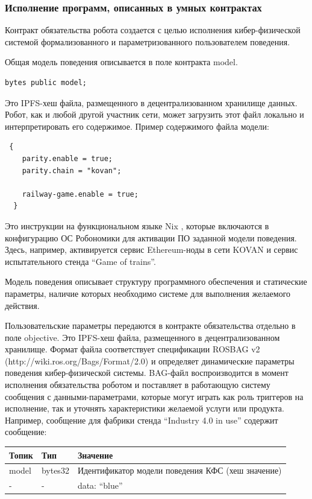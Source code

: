 \documentclass{article}
\begin{document}
\subsubsection{Исполнение программ, описанных в умных контрактах}

Контракт обязательства робота создается с целью исполнения кибер-физической системой формализованного и параметризованного пользователем поведения. 

Общая модель поведения описывается в поле контракта model.
\begin{lstlisting}
bytes public model;
\end{lstlisting}

Это IPFS-хеш файла, размещенного в децентрализованном хранилище данных. Робот, как и любой другой участник сети, может загрузить этот файл локально и интерпретировать его содержимое. Пример содержимого файла модели:

\begin{lstlisting}
 {
    parity.enable = true;
    parity.chain = "kovan";

    railway-game.enable = true;
  }
\end{lstlisting}

Это инструкции на функциональном языке Nix \cite{Dolstra2010NixOS:Distribution}, которые включаются в конфигурацию ОС Робономики для активации ПО заданной модели поведения. Здесь, например, активируется сервис Ethereum-ноды в сети KOVAN и сервис испытательного стенда “Game of trains”.

Модель поведения описывает структуру программного обеспечения и статические параметры, наличие которых необходимо системе для выполнения желаемого действия.

Пользовательские параметры передаются в контракте обязательства отдельно в поле objective. Это IPFS-хеш файла, размещенного в децентрализованном хранилище. Формат файла соответствует спецификации ROSBAG v2 (http://wiki.ros.org/Bags/Format/2.0) и определяет динамические параметры поведения кибер-физической системы. BAG-файл воспроизводится в момент исполнения обязательства роботом и поставляет в работающую систему сообщения с данными-параметрами, которые могут играть как роль триггеров на исполнение, так и уточнять характеристики желаемой услуги или продукта. Например, сообщение для фабрики стенда “Industry 4.0 in use” содержит сообщение:

\begin{tabular}{ |l |l |l }
 \textbf{Топик} & \textbf{Тип} & \textbf{Значение} \\ 
 \hline
 model & bytes32 & Идентификатор модели поведения КФС (хеш значение) \\ 
 - &  - & data: “blue” \\ 
\end{tabular}
\end{document}

